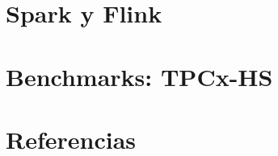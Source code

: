 \documentclass{article}
\begin{document}

\section{Spark y Flink}



\section{Benchmarks: TPCx-HS}



\section{Referencias}

	\printbibliography
\end{document}
